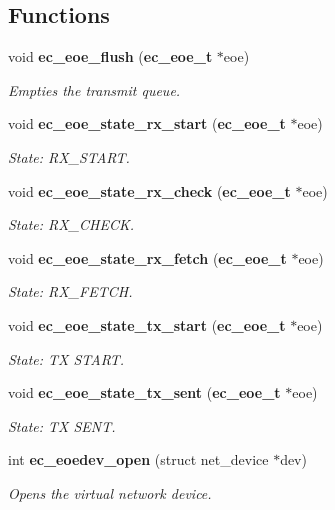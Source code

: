 \subsection*{\-Functions}
\begin{DoxyCompactItemize}
\item 
void {\bf ec\-\_\-eoe\-\_\-flush} ({\bf ec\-\_\-eoe\-\_\-t} $\ast$eoe)
\begin{DoxyCompactList}\small\item\em \-Empties the transmit queue. \end{DoxyCompactList}\item 
void {\bf ec\-\_\-eoe\-\_\-state\-\_\-rx\-\_\-start} ({\bf ec\-\_\-eoe\-\_\-t} $\ast$eoe)
\begin{DoxyCompactList}\small\item\em \-State\-: \-R\-X\-\_\-\-S\-T\-A\-R\-T. \end{DoxyCompactList}\item 
void {\bf ec\-\_\-eoe\-\_\-state\-\_\-rx\-\_\-check} ({\bf ec\-\_\-eoe\-\_\-t} $\ast$eoe)
\begin{DoxyCompactList}\small\item\em \-State\-: \-R\-X\-\_\-\-C\-H\-E\-C\-K. \end{DoxyCompactList}\item 
void {\bf ec\-\_\-eoe\-\_\-state\-\_\-rx\-\_\-fetch} ({\bf ec\-\_\-eoe\-\_\-t} $\ast$eoe)
\begin{DoxyCompactList}\small\item\em \-State\-: \-R\-X\-\_\-\-F\-E\-T\-C\-H. \end{DoxyCompactList}\item 
void {\bf ec\-\_\-eoe\-\_\-state\-\_\-tx\-\_\-start} ({\bf ec\-\_\-eoe\-\_\-t} $\ast$eoe)
\begin{DoxyCompactList}\small\item\em \-State\-: \-T\-X \-S\-T\-A\-R\-T. \end{DoxyCompactList}\item 
void {\bf ec\-\_\-eoe\-\_\-state\-\_\-tx\-\_\-sent} ({\bf ec\-\_\-eoe\-\_\-t} $\ast$eoe)
\begin{DoxyCompactList}\small\item\em \-State\-: \-T\-X \-S\-E\-N\-T. \end{DoxyCompactList}\item 
int {\bf ec\-\_\-eoedev\-\_\-open} (struct net\-\_\-device $\ast$dev)
\begin{DoxyCompactList}\small\item\em \-Opens the virtual network device. \end{DoxyCompactList}\item 

\end{DoxyCompactItemize}
